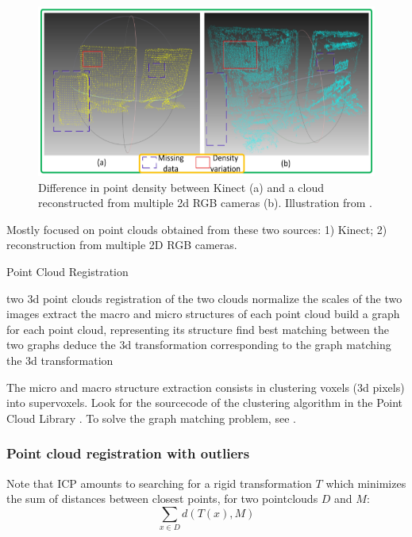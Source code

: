 \documentclass[11pt]{article} %
\begin{document}
\begin{figure}
  \centering
  \includegraphics[width= \linewidth]{kinect.png}
  \caption{Difference in point density between Kinect (a) and a cloud reconstructed from multiple 2d RGB cameras (b). Illustration from \cite{huang:kinect}.}
  \label{fig:kinect}
\end{figure}

Mostly focused on point clouds obtained from these two sources: 1) Kinect; 2) reconstruction from multiple 2D RGB cameras.
\begin{algorithm}
\caption{Point Cloud Registration \cite{huang:kinect}}
\label{algo:kinect}
\begin{algorithmic}
  \REQUIRE two 3d point clouds
  \ENSURE registration of the two clouds
  \STATE normalize the scales of the two images
  \STATE extract the macro and micro structures of each point cloud
  \STATE build a graph for each point cloud, representing its structure
  \STATE find best matching between the two graphs
  \STATE deduce the 3d transformation corresponding to the graph matching
  \RETURN the 3d transformation
\end{algorithmic}
\end{algorithm}

The micro and macro structure extraction consists in clustering voxels (3d pixels) into supervoxels. Look for the sourcecode of the clustering algorithm in the Point Cloud Library \cite{rusu:pclib}.
To solve the graph matching problem, see \cite{zhou:graphmatching, cour:graphmatching, zaslavskiy:graphmatching, frank:quadratic, gertz:ooqp}.

    \subsubsection{Point cloud registration with outliers \cite{papazov:rotations}}
Note that ICP amounts to searching for a rigid transformation $T$ which minimizes the sum of distances between closest points, for two pointclouds $D$ and $M$:
$$\sum_{x \in D} d(T(x),M)$$
\end{document}
